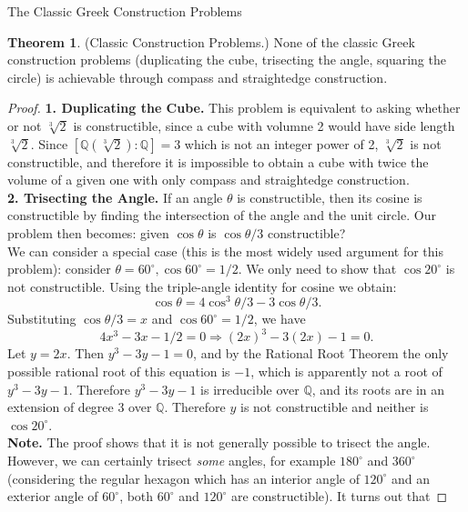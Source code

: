 \documentclass[12pt]{article}
\theoremstyle{definition}
\theoremstyle{definition}
\theoremstyle{definition}
\newtheorem{theorem}{Theorem}[section]
\theoremstyle{definition}
\theoremstyle{definition}
\theoremstyle{definition}
\theoremstyle{definition}
\begin{document}
\begin{section}{The Classic Greek Construction Problems}
    \begin{theorem}{(Classic Construction Problems.)}
        None of the classic Greek construction problems (duplicating the cube, trisecting the angle, squaring the circle) is achievable through compass and straightedge 
        construction.
        \begin{proof}
            \noindent\textbf{1. Duplicating the Cube.} This problem is equivalent to asking whether or not \(\sqrt[3]{2}\) is constructible, since a cube with volumne 2
            would have side length \(\sqrt[3]{2}\). Since \([\mathbb{Q}(\sqrt[3]{2}) : \mathbb{Q}] = 3\) which is not an integer power of 2, \(\sqrt[3]{2}\) is not constructible,
            and therefore it is impossible to obtain a cube with twice the volume of a given one with only compass and straightedge construction.\\
            \break
            \noindent\textbf{2. Trisecting the Angle.} If an angle \(\theta\) is constructible, then its cosine is constructible by finding the intersection of the angle and 
            the unit circle. Our problem then becomes: given \(\cos \theta\) is \(\cos \theta/3\) constructible?\\
            We can consider a special case (this is the most widely used argument for this problem): consider \(\theta = 60^{\circ}, \cos 60^{\circ} = 1/2\). We only need to show that \(\cos 20^{\circ}\)
            is not constructible. Using the triple-angle identity for cosine we obtain:
            \[\cos \theta = 4\cos^3 \theta/3 - 3\cos \theta/3.\]
            Substituting \(\cos \theta/3 = x\) and \(\cos 60^{\circ} = 1/2\), we have 
            \[4x^3 - 3x - 1/2 = 0 \Rightarrow (2x)^3 - 3(2x) - 1=0.\]
            Let \(y = 2x\). Then \(y^3 - 3y - 1=0\), and by the Rational Root Theorem the only possible rational root of this equation is \(-1\), which is apparently not a root of 
            \(y^3 - 3y - 1\). Therefore \(y^3 - 3y - 1\) is irreducible over \(\mathbb{Q}\), and its roots are in an extension of degree 3 over \(\mathbb{Q}\). Therefore \(y\) is not 
            constructible and neither is \(\cos 20^{\circ}\).\\
            \noindent\textbf{Note.} The proof shows that it is not generally possible to trisect the angle. However, we can certainly trisect \textit{some} angles, for example \(180^{\circ}\) and \(360^{\circ}\)
            (considering the regular hexagon which has an interior angle of \(120^{\circ}\) and an exterior angle of \(60^{\circ}\), both \(60^{\circ}\) and \(120^{\circ}\) are constructible). It turns out that 

\end{proof}
\end{theorem}
\end{section}
\end{document}
